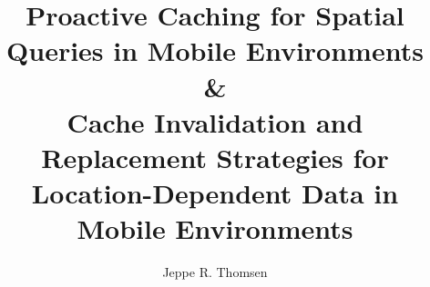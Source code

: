 \documentclass[t]{beamer}
\title[Fall Presentation 2010\hspace{14em}\insertframenumber/\inserttotalframenumber]{Proactive Caching for Spatial Queries in Mobile Environments \\\&\\ Cache Invalidation and Replacement Strategies for Location-Dependent Data in Mobile Environments}
\author[Jeppe R. Thomsen]{Jeppe R. Thomsen}%
\institute{Hong Kong Polytechnic University\\ Department of Computing}
\begin{document}
\begin{frame} %
\titlepage
\end{frame}
%
%
%

%
%


%
%
%
%
\end{document}
